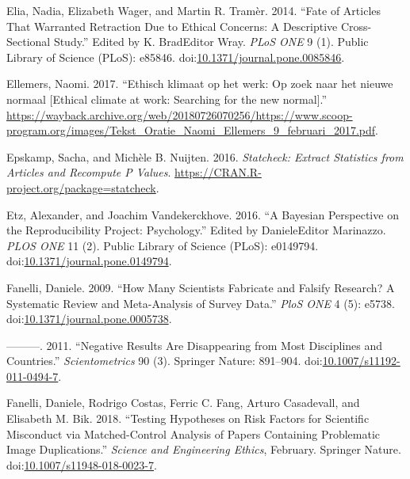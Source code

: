 \documentclass[a5paper]{book}
\begin{document}
\hypertarget{ref-doi:10.1371ux2fjournal.pone.0085846}{}
Elia, Nadia, Elizabeth Wager, and Martin R. Tramèr. 2014. ``Fate of
Articles That Warranted Retraction Due to Ethical Concerns: A
Descriptive Cross-Sectional Study.'' Edited by K. BradEditor Wray.
\emph{PLoS ONE} 9 (1). Public Library of Science (PLoS): e85846.
doi:\href{https://doi.org/10.1371/journal.pone.0085846}{10.1371/journal.pone.0085846}.

\hypertarget{ref-ellemers}{}
Ellemers, Naomi. 2017. ``Ethisch klimaat op het werk: Op zoek naar het
nieuwe normaal {[}Ethical climate at work: Searching for the new
normal{]}.''
\url{https://wayback.archive.org/web/20180726070256/https://www.scoop-program.org/images/Tekst_Oratie_Naomi_Ellemers_9_februari_2017.pdf}.

\hypertarget{ref-statcheck}{}
Epskamp, Sacha, and Michèle B. Nuijten. 2016. \emph{Statcheck: Extract
Statistics from Articles and Recompute P Values}.
\url{https://CRAN.R-project.org/package=statcheck}.

\hypertarget{ref-doi:10.1371ux2fjournal.pone.0149794}{}
Etz, Alexander, and Joachim Vandekerckhove. 2016. ``A Bayesian
Perspective on the Reproducibility Project: Psychology.'' Edited by
DanieleEditor Marinazzo. \emph{PLOS ONE} 11 (2). Public Library of
Science (PLoS): e0149794.
doi:\href{https://doi.org/10.1371/journal.pone.0149794}{10.1371/journal.pone.0149794}.

\hypertarget{ref-doi:10.1371ux2fjournal.pone.0005738}{}
Fanelli, Daniele. 2009. ``How Many Scientists Fabricate and Falsify
Research? A Systematic Review and Meta-Analysis of Survey Data.''
\emph{PloS ONE} 4 (5): e5738.
doi:\href{https://doi.org/10.1371/journal.pone.0005738}{10.1371/journal.pone.0005738}.

\hypertarget{ref-doi:10.1007ux2fs11192-011-0494-7}{}
---------. 2011. ``Negative Results Are Disappearing from Most
Disciplines and Countries.'' \emph{Scientometrics} 90 (3). Springer
Nature: 891--904.
doi:\href{https://doi.org/10.1007/s11192-011-0494-7}{10.1007/s11192-011-0494-7}.

\hypertarget{ref-doi:10.1007ux2fs11948-018-0023-7}{}
Fanelli, Daniele, Rodrigo Costas, Ferric C. Fang, Arturo Casadevall, and
Elisabeth M. Bik. 2018. ``Testing Hypotheses on Risk Factors for
Scientific Misconduct via Matched-Control Analysis of Papers Containing
Problematic Image Duplications.'' \emph{Science and Engineering Ethics},
February. Springer Nature.
doi:\href{https://doi.org/10.1007/s11948-018-0023-7}{10.1007/s11948-018-0023-7}.
\end{document}
